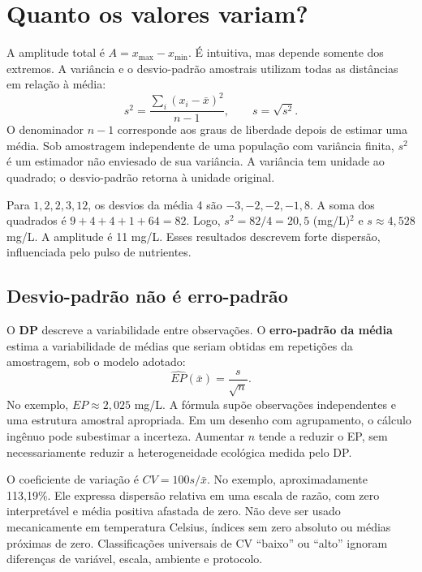 \section{Quanto os valores variam?}
A amplitude total é $A=x_{\max}-x_{\min}$. É intuitiva, mas depende somente dos extremos. A variância e o desvio-padrão amostrais utilizam todas as distâncias em relação à média:
\begin{equation}s^2=\frac{\sum_i(x_i-\bar{x})^2}{n-1},\qquad s=\sqrt{s^2}.\end{equation}
O denominador $n-1$ corresponde aos graus de liberdade depois de estimar uma média. Sob amostragem independente de uma população com variância finita, $s^2$ é um estimador não enviesado de sua variância. A variância tem unidade ao quadrado; o desvio-padrão retorna à unidade original.

\begin{exemplo}
Para $1,2,2,3,12$, os desvios da média 4 são $-3,-2,-2,-1,8$. A soma dos quadrados é $9+4+4+1+64=82$. Logo, $s^2=82/4=20{,}5$ (mg/L)$^2$ e $s\approx4{,}528$ mg/L. A amplitude é 11 mg/L. Esses resultados descrevem forte dispersão, influenciada pelo pulso de nutrientes.
\end{exemplo}

\subsection{Desvio-padrão não é erro-padrão}
O \textbf{DP} descreve a variabilidade entre observações. O \textbf{erro-padrão da média} estima a variabilidade de médias que seriam obtidas em repetições da amostragem, sob o modelo adotado:
\begin{equation}\widehat{EP}(\bar{x})=\frac{s}{\sqrt n}.\end{equation}
No exemplo, $EP\approx2{,}025$ mg/L. A fórmula supõe observações independentes e uma estrutura amostral apropriada. Em um desenho com agrupamento, o cálculo ingênuo pode subestimar a incerteza. Aumentar $n$ tende a reduzir o EP, sem necessariamente reduzir a heterogeneidade ecológica medida pelo DP.

O coeficiente de variação é $CV=100s/\bar{x}$. No exemplo, aproximadamente 113,19\%. Ele expressa dispersão relativa em uma escala de razão, com zero interpretável e média positiva afastada de zero. Não deve ser usado mecanicamente em temperatura Celsius, índices sem zero absoluto ou médias próximas de zero. Classificações universais de CV ``baixo'' ou ``alto'' ignoram diferenças de variável, escala, ambiente e protocolo.

